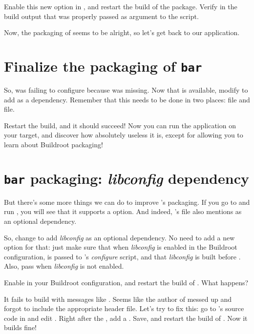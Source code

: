 Enable this new option in , and restart the build of
the package. Verify in the build output that
 was properly passed as argument to the
 script.

Now, the packaging of  seems to be alright, so let's get
back to our  application.

\section{Finalize the packaging of {\tt bar}}

So,  was failing to configure because  was
missing. Now that  is available, modify  to add
 as a dependency. Remember that this needs to be done in
two places:  file and  file.

Restart the build, and it should succeed! Now you can run the
 application on your target, and discover how absolutely
useless it is, except for allowing you to learn about Buildroot
packaging!

\section{{\tt bar} packaging: {\em libconfig} dependency}

But there's some more things we can do to improve 's
packaging. If you go to  and run
, you will see that it supports a
 option. And indeed, 's 
file also mentions  as an optional dependency.

So, change  to add {\em libconfig} as an optional
dependency. No need to add a new  option for that:
just make sure that when {\em libconfig} is enabled in the Buildroot
configuration,  is passed to 's {\em
configure} script, and that {\em libconfig} is built before
. Also, pass  when {\em libconfig}
is not enabled.

Enable  in your Buildroot configuration, and restart
the build of . What happens?

It fails to build with messages like . Seems like the author of  messed up and forgot
to include the appropriate header file. Let's try to fix this: go to
's source code in  and edit
. Right after the ,
add a . Save, and restart the build of
. Now it builds fine!

